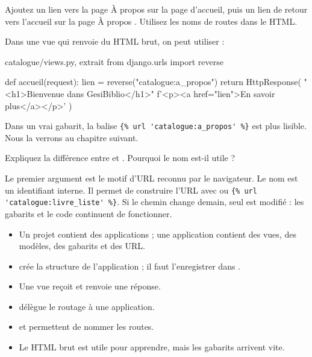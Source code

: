 \begin{exercice}
Ajoutez un lien vers la page \og À propos \fg{} sur la page d'accueil, puis un lien
de retour vers l'accueil sur la page \og À propos \fg. Utilisez les noms de routes
dans le HTML.
\end{exercice}

\begin{correction}
Dans une vue qui renvoie du HTML brut, on peut utiliser  :

\begin{codebox}[python]{catalogue/views.py, extrait}
from django.urls import reverse


def accueil(request):
    lien = reverse("catalogue:a_propos")
    return HttpResponse(
        "<h1>Bienvenue dans GesiBiblio</h1>"
        f'<p><a href="{lien}">En savoir plus</a></p>'
    )
\end{codebox}

Dans un vrai gabarit, la balise \lstinline|{% url 'catalogue:a_propos' %}| est
plus lisible. Nous la verrons au chapitre suivant.
\end{correction}

\begin{exercice}
Expliquez la différence entre  et
. Pourquoi le nom est-il utile ?
\end{exercice}

\begin{correction}
Le premier argument est le motif d'URL reconnu par le navigateur. Le nom
 est un identifiant interne. Il permet de construire l'URL avec
 ou
\lstinline|{% url 'catalogue:livre_liste' %}|. Si le chemin change demain, seul
 est modifié : les gabarits et le code continuent de fonctionner.
\end{correction}

\begin{retenir}
\begin{itemize}
  \item Un projet contient des applications ; une application contient des vues,
        des modèles, des gabarits et des URL.
  \item {} crée la structure de l'application ; il faut l'enregistrer
        dans .
  \item Une vue reçoit  et renvoie une réponse.
  \item {} délègue le routage à une application.
  \item {} et  permettent de nommer les routes.
  \item Le HTML brut est utile pour apprendre, mais les gabarits arrivent vite.
\end{itemize}
\end{retenir}
